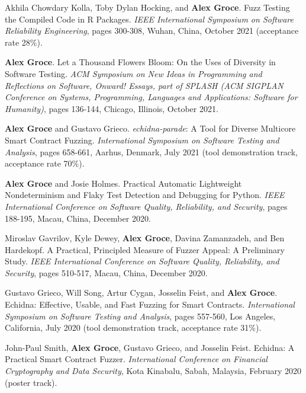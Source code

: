 \documentclass[ComputerScience]{vita}
\begin{document}
\begin{vita}
\begin{Refereed Conference and Workshop Publications}
\item Akhila Chowdary Kolla, Toby Dylan Hocking, and {\bf Alex Groce}.
\newblock Fuzz Testing the Compiled Code in R Packages.
\newblock \emph{IEEE International Symposium on Software Reliability
  Engineering}, pages 300-308, Wuhan, China, October 2021 (acceptance rate 28\%).

\item
{\bf Alex Groce}.
\newblock Let a Thousand Flowers Bloom: On the Uses of Diversity in Software Testing.
\newblock \emph{ACM Symposium on New Ideas in Programming and
  Reflections on Software, Onward! Essays, part of SPLASH (ACM SIGPLAN
  Conference on Systems, Programming, Languages and Applications:
  Software for Humanity)}, pages 136-144, Chicago, Illinois, October 2021.

\item {\bf Alex Groce} and Gustavo Grieco.
  \newblock \emph{echidna-parade}: A Tool for Diverse Multicore Smart Contract Fuzzing.
  \newblock \emph{International Symposium on Software Testing and
  Analysis}, pages 658-661, Aarhus, Denmark, July
2021 (tool demonstration track, acceptance rate 70\%).
  
\item {\bf Alex Groce} and Josie Holmes.
\newblock Practical Automatic Lightweight Nondeterminism and
           Flaky Test Detection and Debugging for Python.
\newblock \emph{IEEE International Conference on Software
Quality, Reliability, and Security}, pages 188-195, Macau,
China, December 2020.
  
\item Miroslav Gavrilov, Kyle Dewey, {\bf Alex Groce}, Davina Zamanzadeh,
  and Ben Hardekopf.
\newblock A Practical, Principled Measure of Fuzzer Appeal: A
Preliminary Study.
\newblock \emph{IEEE International Conference on Software
Quality, Reliability, and Security}, pages 510-517, Macau,
China, December 2020.
  
\item Gustavo Grieco, Will Song, Artur Cygan, Josselin Feist, and {\bf
    Alex Groce}.
\newblock Echidna: Effective, Usable, and Fast Fuzzing for Smart Contracts.
\newblock \emph{International Symposium on Software Testing and
  Analysis}, pages 557-560, Los Angeles, California, July
2020 (tool demonstration track, acceptance rate 31\%).
  
\item John-Paul Smith, {\bf Alex Groce}, Gustavo Grieco, and Josselin Feist.
\newblock Echidna: A Practical Smart Contract Fuzzer.
\newblock \emph{International Conference on Financial Cryptography and
  Data Security}, Kota Kinabalu, Sabah,
Malaysia, February 2020 (poster track).
  

\end{Refereed Conference and Workshop Publications}
\end{vita}
\end{document}
